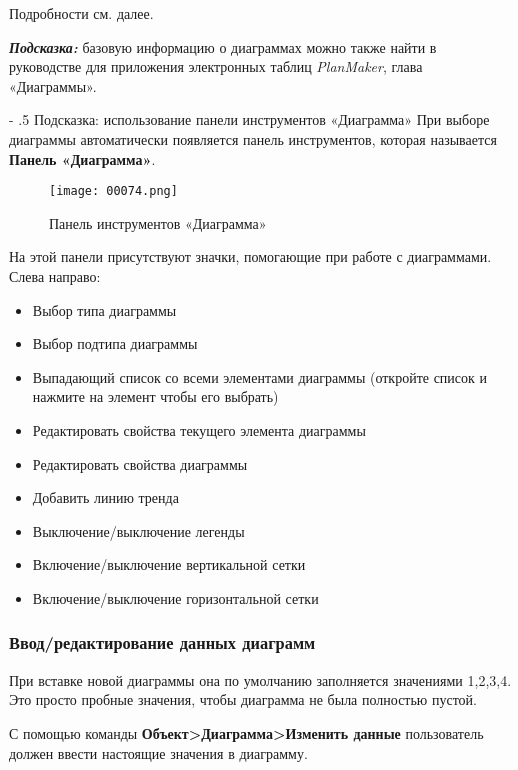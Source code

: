 ﻿\documentclass[a4paper,10pt]{article}
\makeatletter
\renewcommand\paragraph{%
   \@startsection{paragraph}{4}{0mm}%
      {-\baselineskip}%
      {.5\baselineskip}%
      {\normalfont\normalsize\bfseries}}
\makeatother
\begin{document}
Подробности см. далее.

\begin{mdframed}[backgroundcolor=blue!10]
\textbf{\textit{Подсказка:}} базовую информацию о диаграммах можно также найти в руководстве для приложения электронных таблиц \textit{PlanMaker}, глава «Диаграммы». 
\end{mdframed}

\paragraph{Подсказка: использование панели инструментов «Диаграмма»}
При выборе диаграммы автоматически появляется панель инструментов, которая называется \textbf{Панель «Диаграмма»}.

\begin{figure}[ht]
\texttt{[image: 00074.png]}
\centering
\caption{Панель инструментов «Диаграмма»}
\end{figure}

На этой панели присутствуют значки, помогающие при работе с диаграммами. Слева направо:

\begin{itemize}
 \item Выбор типа диаграммы
 \item Выбор подтипа диаграммы
 \item Выпадающий список со всеми элементами диаграммы (откройте список и нажмите на элемент чтобы его выбрать)
 \item Редактировать свойства текущего элемента диаграммы
 \item Редактировать свойства диаграммы
 \item Добавить линию тренда
 \item Выключение/выключение легенды
 \item Включение/выключение вертикальной сетки
 \item Включение/выключение горизонтальной сетки
\end{itemize}

\subsubsection{Ввод/редактирование данных диаграмм}
При вставке новой диаграммы она по умолчанию заполняется значениями 1,2,3,4. Это просто пробные значения, чтобы диаграмма не была полностью пустой.

С помощью команды \textbf{Объект>Диаграмма>Изменить данные} пользователь должен ввести настоящие значения в диаграмму.
\end{document}
